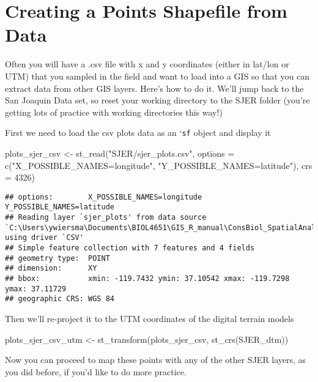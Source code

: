 \documentclass[
]{book}
\newenvironment{Shaded}{\begin{snugshade}}{\end{snugshade}}
\newcommand{\AttributeTok}[1]{\textcolor[rgb]{0.77,0.63,0.00}{#1}}
\newcommand{\DecValTok}[1]{\textcolor[rgb]{0.00,0.00,0.81}{#1}}
\newcommand{\FunctionTok}[1]{\textcolor[rgb]{0.00,0.00,0.00}{#1}}
\newcommand{\NormalTok}[1]{#1}
\newcommand{\OtherTok}[1]{\textcolor[rgb]{0.56,0.35,0.01}{#1}}
\newcommand{\StringTok}[1]{\textcolor[rgb]{0.31,0.60,0.02}{#1}}
\begin{document}
\hypertarget{PointsData}{%
\chapter{Creating a Points Shapefile from Data}\label{PointsData}}

Often you will have a .csv file with x and y coordinates (either in lat/lon or UTM) that you sampled in the field and want to load into a GIS so that you can extract data from other GIS layers. Here's how to do it. We'll jump back to the San Joaquin Data set, so reset your working directory to the SJER folder (you're getting lots of practice with working directories this way!)

First we need to load the csv plots data as an `\texttt{sf} object and display it

\begin{Shaded}
\begin{Highlighting}[]
\NormalTok{plots\_sjer\_csv }\OtherTok{\textless{}{-}} \FunctionTok{st\_read}\NormalTok{(}\StringTok{"SJER/sjer\_plots.csv"}\NormalTok{, }\AttributeTok{options =} \FunctionTok{c}\NormalTok{(}\StringTok{"X\_POSSIBLE\_NAMES=longitude"}\NormalTok{, }\StringTok{"Y\_POSSIBLE\_NAMES=latitude"}\NormalTok{), }\AttributeTok{crs =} \DecValTok{4326}\NormalTok{)}
\end{Highlighting}
\end{Shaded}

\begin{verbatim}
## options:        X_POSSIBLE_NAMES=longitude Y_POSSIBLE_NAMES=latitude 
## Reading layer `sjer_plots' from data source `C:\Users\ywiersma\Documents\BIOL4651\GIS_R_manual\ConsBiol_SpatialAnalysis\SJER\sjer_plots.csv' using driver `CSV'
## Simple feature collection with 7 features and 4 fields
## geometry type:  POINT
## dimension:      XY
## bbox:           xmin: -119.7432 ymin: 37.10542 xmax: -119.7298 ymax: 37.11729
## geographic CRS: WGS 84
\end{verbatim}

Then we'll re-project it to the UTM coordinates of the digital terrain models

\begin{Shaded}
\begin{Highlighting}[]
\NormalTok{plots\_sjer\_csv\_utm }\OtherTok{\textless{}{-}} \FunctionTok{st\_transform}\NormalTok{(plots\_sjer\_csv, }\FunctionTok{st\_crs}\NormalTok{(SJER\_dtm))}
\end{Highlighting}
\end{Shaded}

Now you can proceed to map these points with any of the other SJER layers, as you did before, if you'd like to do more practice.
\end{document}

